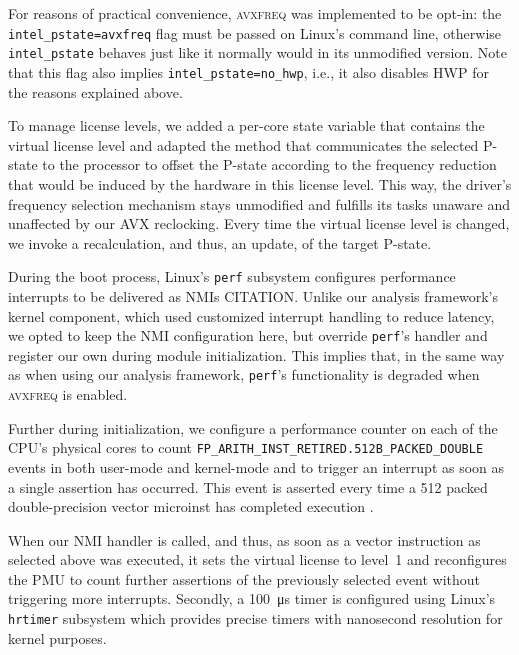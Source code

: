 For reasons of practical convenience, \textsc{avxfreq} was implemented to be opt-in: the \texttt{intel\_pstate=avxfreq} flag must be passed on Linux's command line, otherwise \texttt{intel\_pstate} behaves just like it normally would in its unmodified version. Note that this flag also implies \texttt{intel\_pstate=no\_hwp}, i.e., it also disables \gls{HWP} for the reasons explained above.

To manage license levels, we added a per-core state variable that contains the virtual license level and adapted the method that communicates the selected \gls{P-state} to the processor to offset the \gls{P-state} according to the frequency reduction that would be induced by the hardware in this license level. This way, the driver's frequency selection mechanism stays unmodified and fulfills its tasks unaware and unaffected by our \gls{AVX} reclocking. Every time the virtual license level is changed, we invoke a recalculation, and thus, an update, of the target \gls{P-state}.

During the boot process, Linux's \texttt{perf} subsystem configures performance interrupts to be delivered as \glspl{NMI} CITATION. Unlike our analysis framework's kernel component, which used customized interrupt handling to reduce latency, we opted to keep the \gls{NMI} configuration here, but override \texttt{perf}'s handler and register our own during module initialization. This implies that, in the same way as when using our analysis framework, \texttt{perf}'s functionality is degraded when \textsc{avxfreq} is enabled.

Further during initialization, we configure a performance counter on each of the \gls{CPU}'s physical cores to count  \texttt{FP\_ARITH\_INST\_RETIRED.512B\_PACKED\_DOUBLE} events in both user-mode and kernel-mode and to trigger an interrupt as soon as a single assertion has occurred. This event is asserted every time a \SI{512}{\bit} packed double-precision vector \gls{microinst} has completed execution \cite{intelsdmsysprogguide}.

When our \gls{NMI} handler is called, and thus, as soon as a vector instruction as selected above was executed, it sets the virtual license to level~1 and reconfigures the \gls{PMU} to count further assertions of the previously selected event without triggering more interrupts. Secondly, a \SI{100}{\micro\second} timer is configured using Linux's \texttt{hrtimer} subsystem which provides precise timers with nanosecond resolution for kernel purposes.

